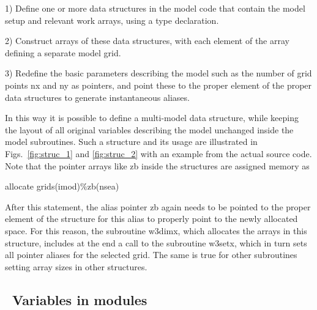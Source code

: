 \begin{list}{}{\rightmargin 8mm \leftmargin 10mm }

\item [1)] Define one or more data structures in the model code that contain
           the model setup and relevant work arrays, using a {\F type}
           declaration.

\item [2)] Construct arrays of these data structures, with each element of the
           array defining a separate model grid.

\item [3)] Redefine the basic parameters describing the model such as the
           number of grid points {\F nx} and {\F ny} as pointers, and point
           these to the proper element of the proper data structures to
           generate instantaneous aliases.

\end{list}



\noindent
In this way it is possible to define a multi-model data structure, while
keeping the layout of all original variables describing the model unchanged
inside the model subroutines.  Such a structure and its usage are illustrated
in Figs.~\ref{fig:struc_1} and \ref{fig:struc_2} with an example from the
actual source code. Note that the pointer arrays like {\F zb} inside the
structures are assigned memory as

\vspace{\baselineskip}
\centerline{\F allocate grids(imod)\%zb(nsea)}
\vspace{\baselineskip}

\noindent
After this statement, the alias pointer {\F zb} again needs to be pointed to
the proper element of the structure for this alias to properly point to the
newly allocated space. For this reason, the subroutine {\F w3dimx}, which
allocates the arrays in this structure, includes at the end a call to the
subroutine {\F w3setx}, which in turn sets all pointer aliases for the
selected grid. The same is true for other subroutines setting array sizes in
other structures.




\vsssub
\subsection{~Variables in modules} \label{sec:variables}
\vsssub

